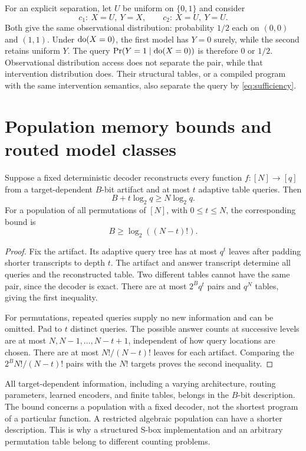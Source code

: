 For an explicit separation, let $U$ be uniform on $\{0,1\}$ and consider
\[
 c_1:\ X=U,\ Y=X,\qquad c_2:\ X=U,\ Y=U.
\]
Both give the same observational distribution: probability $1/2$ each on $(0,0)$ and $(1,1)$. Under $\operatorname{do}(X=0)$, the first model has $Y=0$ surely, while the second retains uniform $Y$. The query $\Pr(Y=1\mid\operatorname{do}(X=0))$ is therefore $0$ or $1/2$. Observational distribution access does not separate the pair, while that intervention distribution does. Their structural tables, or a compiled program with the same intervention semantics, also separate the query by \eqref{eq:sufficiency}.

\section{Population memory bounds and routed model classes}\label{app:tables}
\begin{proposition}
Suppose a fixed deterministic decoder reconstructs every function $f:[N]\to[q]$ from a target-dependent $B$-bit artifact and at most $t$ adaptive table queries. Then
\[
 B+t\log_2q\ge N\log_2q.
\]
For a population of all permutations of $[N]$, with $0\le t\le N$, the corresponding bound is
\[
 B\ge\log_2((N-t)!).
\]
\end{proposition}
\begin{proof}
Fix the artifact. Its adaptive query tree has at most $q^t$ leaves after padding shorter transcripts to depth $t$. The artifact and answer transcript determine all queries and the reconstructed table. Two different tables cannot have the same pair, since the decoder is exact. There are at most $2^Bq^t$ pairs and $q^N$ tables, giving the first inequality.

For permutations, repeated queries supply no new information and can be omitted. Pad to $t$ distinct queries. The possible answer counts at successive levels are at most $N,N-1,\ldots,N-t+1$, independent of how query locations are chosen. There are at most $N!/(N-t)!$ leaves for each artifact. Comparing the $2^B N!/(N-t)!$ pairs with the $N!$ targets proves the second inequality.
\end{proof}
All target-dependent information, including a varying architecture, routing parameters, learned encoders, and finite tables, belongs in the $B$-bit description. The bound concerns a population with a fixed decoder, not the shortest program of a particular function. A restricted algebraic population can have a shorter description. This is why a structured S-box implementation and an arbitrary permutation table belong to different counting problems.


